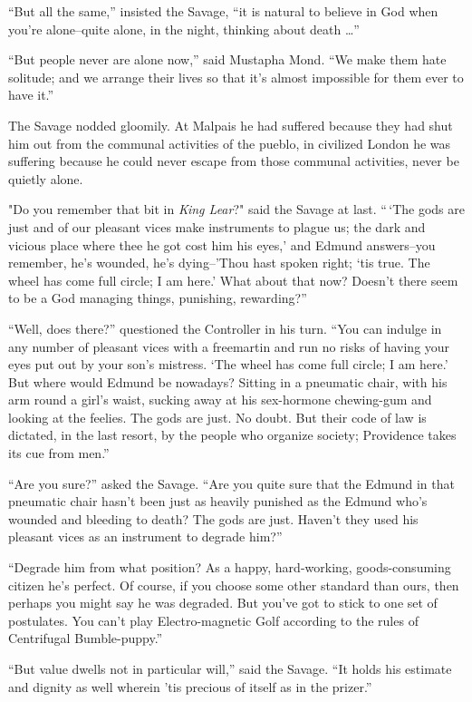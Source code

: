 \documentclass[12pt]{report}
\begin{document}
``But all the same,'' insisted the Savage, ``it is natural to believe in
God when you're alone--quite alone, in the night, thinking about death
\ldots{}''

``But people never are alone now,'' said Mustapha Mond. ``We make them
hate solitude; and we arrange their lives so that it's almost impossible
for them ever to have it.''

The Savage nodded gloomily. At Malpais he had suffered because they had
shut him out from the communal activities of the pueblo, in civilized
London he was suffering because he could never escape from those
communal activities, never be quietly alone.

"Do you remember that bit in \emph{King Lear}?" said the Savage at last.
``\,`The gods are just and of our pleasant vices make instruments to
plague us; the dark and vicious place where thee he got cost him his
eyes,' and Edmund answers--you remember, he's wounded, he's dying--'Thou
hast spoken right; `tis true. The wheel has come full circle; I am
here.' What about that now? Doesn't there seem to be a God managing
things, punishing, rewarding?''

``Well, does there?'' questioned the Controller in his turn. ``You can
indulge in any number of pleasant vices with a freemartin and run no
risks of having your eyes put out by your son's mistress. `The wheel has
come full circle; I am here.' But where would Edmund be nowadays?
Sitting in a pneumatic chair, with his arm round a girl's waist, sucking
away at his sex-hormone chewing-gum and looking at the feelies. The gods
are just. No doubt. But their code of law is dictated, in the last
resort, by the people who organize society; Providence takes its cue
from men.''

``Are you sure?'' asked the Savage. ``Are you quite sure that the Edmund
in that pneumatic chair hasn't been just as heavily punished as the
Edmund who's wounded and bleeding to death? The gods are just. Haven't
they used his pleasant vices as an instrument to degrade him?''

``Degrade him from what position? As a happy, hard-working,
goods-consuming citizen he's perfect. Of course, if you choose some
other standard than ours, then perhaps you might say he was degraded.
But you've got to stick to one set of postulates. You can't play
Electro-magnetic Golf according to the rules of Centrifugal
Bumble-puppy.''

``But value dwells not in particular will,'' said the Savage. ``It holds
his estimate and dignity as well wherein 'tis precious of itself as in
the prizer.''
\end{document}
